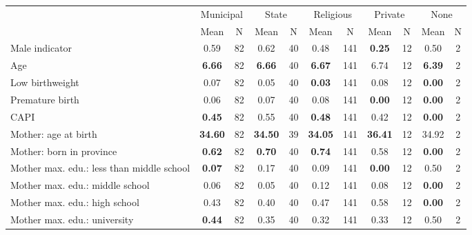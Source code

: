 \begin{tabular}{l c c c c c c c c c c}
\toprule
& \multicolumn{2}{c}{Municipal} & \multicolumn{2}{c}{State} & \multicolumn{2}{c}{Religious} & \multicolumn{2}{c}{Private} & \multicolumn{2}{c}{None} \\
& \scriptsize Mean & \scriptsize N & \scriptsize Mean & \scriptsize N & \scriptsize Mean & \scriptsize N & \scriptsize Mean & \scriptsize N & \scriptsize Mean & \scriptsize N \\
\midrule
Male indicator &      0.59 &        82 &      0.62 &        40 &      0.48 &       141 & \textbf{     0.25} &        12 &      0.50 &         2 \\
Age & \textbf{     6.66} &        82 & \textbf{     6.66} &        40 & \textbf{     6.67} &       141 &      6.74 &        12 & \textbf{     6.39} &         2 \\
Low birthweight &      0.07 &        82 &      0.05 &        40 & \textbf{     0.03} &       141 &      0.08 &        12 & \textbf{     0.00} &         2 \\
Premature birth &      0.06 &        82 &      0.07 &        40 &      0.08 &       141 & \textbf{     0.00} &        12 & \textbf{     0.00} &         2 \\
CAPI & \textbf{     0.45} &        82 &      0.55 &        40 & \textbf{     0.48} &       141 &      0.42 &        12 & \textbf{     0.00} &         2 \\
Mother: age at birth & \textbf{    34.60} &        82 & \textbf{    34.50} &        39 & \textbf{    34.05} &       141 & \textbf{    36.41} &        12 &     34.92 &         2 \\
Mother: born in province & \textbf{     0.62} &        82 & \textbf{     0.70} &        40 & \textbf{     0.74} &       141 &      0.58 &        12 & \textbf{     0.00} &         2 \\
Mother max. edu.: less than middle school & \textbf{     0.07} &        82 &      0.17 &        40 &      0.09 &       141 & \textbf{     0.00} &        12 &      0.50 &         2 \\
Mother max. edu.: middle school &      0.06 &        82 &      0.05 &        40 &      0.12 &       141 &      0.08 &        12 & \textbf{     0.00} &         2 \\
Mother max. edu.: high school &      0.43 &        82 &      0.40 &        40 &      0.47 &       141 &      0.58 &        12 & \textbf{     0.00} &         2 \\
Mother max. edu.: university & \textbf{     0.44} &        82 &      0.35 &        40 &      0.32 &       141 &      0.33 &        12 &      0.50 &         2 \\

\end{tabular}

